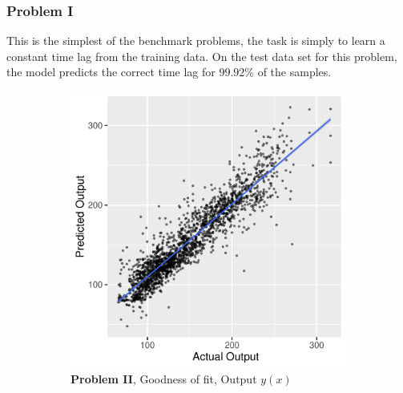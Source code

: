 \documentclass[envcountsect,runningheads]{llncs}
\theoremstyle{etoile}
\begin{document}
\subsubsection{Problem I}

This is the simplest of the benchmark problems, the task is simply to learn a constant time lag from 
the training data. On the test data set for this problem, the model predicts the correct time lag for 
$99.92\%$ of the samples.


\begin{figure}
  \centering

  \begin{subfigure}[b]{0.4\textwidth}
    \centering
    \includegraphics[width=\textwidth]{figures/exp2_scatter_v_test}
    \caption{ \textbf{Problem II}, Goodness of fit, Output $y(x)$}
    \label{fig:problem2_fitv}
  \end{subfigure}
  \hfill
  \begin{subfigure}[b]{0.4\textwidth}
    \centering

\end{subfigure}
\end{figure}
\end{document}
